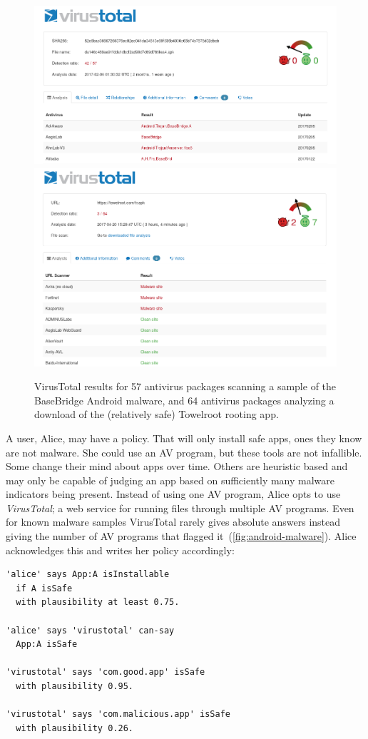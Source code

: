 \documentclass[thesis.tex]{subfiles}
\begin{document}
\begin{figure}
  \centering
  \includegraphics[width=0.49\linewidth]{figures/android-malware.png}
  \includegraphics[width=0.49\linewidth]{figures/towelroot.png}
  \caption[VirusTotal results for two Android apps.]{VirusTotal results for 57
    antivirus packages scanning a sample of the BaseBridge Android malware, and 64
    antivirus packages analyzing a download of the (relatively safe) Towelroot
    rooting app.}
  \label{fig:android-malware}
\end{figure}

A user, Alice, may have a policy. That will only install safe apps, ones they
know are not malware. She could use an \ac{AV} program, but these tools are not
infallible. Some change their mind about apps over time. Others are heuristic
based and may only be capable of judging an app based on sufficiently many
malware indicators being present. Instead of using one \ac{AV} program, Alice
opts to use \emph{VirusTotal}; a web service for running files through multiple
\ac{AV} programs. Even for known malware samples VirusTotal rarely gives
absolute answers instead giving the number of \ac{AV} programs that flagged
it~(\autoref{fig:android-malware}). Alice acknowledges this and writes her
policy accordingly:

\begin{lstlisting}
'alice' says App:A isInstallable
  if A isSafe
  with plausibility at least 0.75.

'alice' says 'virustotal' can-say
  App:A isSafe

'virustotal' says 'com.good.app' isSafe
  with plausibility 0.95.

'virustotal' says 'com.malicious.app' isSafe
  with plausibility 0.26.
\end{lstlisting}
\end{document}
